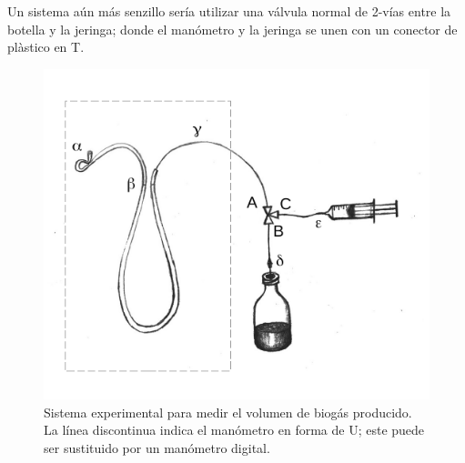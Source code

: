\documentclass[]{article}
\begin{document}
Un sistema aún más senzillo sería utilizar una válvula normal de 2-vías entre la botella y la jeringa; donde el manómetro y la jeringa se unen con un conector de plàstico en T.

\begin{figure}
  \includegraphics[]{figs/GD_utube.pdf}
  \caption{Sistema experimental para medir el volumen de biogás producido. La línea discontinua indica el manómetro en forma de U; este puede ser sustituido por un manómetro digital.} 
  \label{fig:utube}
\end{figure}
\end{document}

